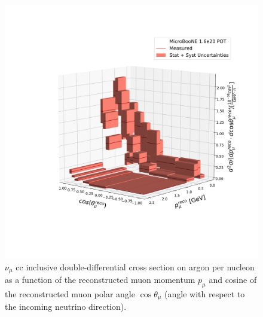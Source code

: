 \begin{figure}[]
\centering
\includegraphics[width=1.0\textwidth]{images/XSecFinal/3d_xsec} %
\caption[Double-Differential Cross Section (Stat. $\oplus$ Syst. Unc.)]{$\nu_\mu$ \acrshort{cc} inclusive double-differential cross section on argon per nucleon as a function of the reconstructed muon momentum $p_\mu$ and cosine of the reconstructed muon polar angle $\cos\theta_\mu$ (angle with respect to the incoming neutrino direction).}
\label{fig:3d_xsec}
\end{figure}

